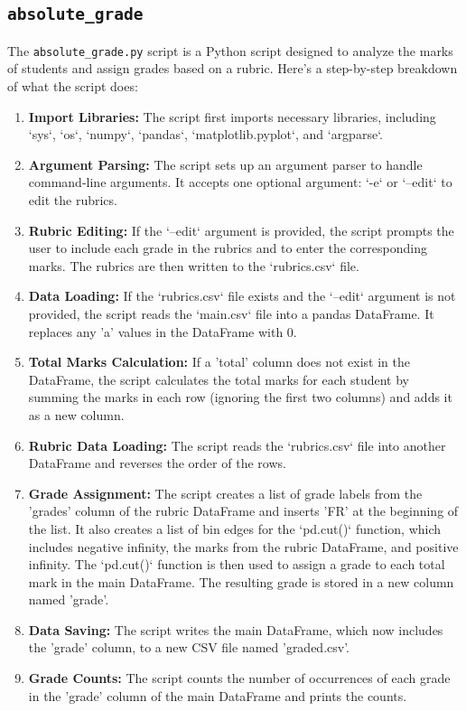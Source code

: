\documentclass{article}
\begin{document}
\subsection{\texttt{absolute\_grade}}
The \texttt{absolute\_grade.py} script is a Python script designed to analyze the marks of students and assign grades based on a rubric. Here's a step-by-step breakdown of what the script does:

\begin{enumerate}
    \item \textbf{Import Libraries:} The script first imports necessary libraries, including `sys`, `os`, `numpy`, `pandas`, `matplotlib.pyplot`, and `argparse`.

    \item \textbf{Argument Parsing:} The script sets up an argument parser to handle command-line arguments. It accepts one optional argument: `-e` or `--edit` to edit the rubrics.

    \item \textbf{Rubric Editing:} If the `--edit` argument is provided, the script prompts the user to include each grade in the rubrics and to enter the corresponding marks. The rubrics are then written to the `rubrics.csv` file.

    \item \textbf{Data Loading:} If the `rubrics.csv` file exists and the `--edit` argument is not provided, the script reads the `main.csv` file into a pandas DataFrame. It replaces any 'a' values in the DataFrame with 0.

    \item \textbf{Total Marks Calculation:} If a 'total' column does not exist in the DataFrame, the script calculates the total marks for each student by summing the marks in each row (ignoring the first two columns) and adds it as a new column.

    \item \textbf{Rubric Data Loading:} The script reads the `rubrics.csv` file into another DataFrame and reverses the order of the rows.

    \item \textbf{Grade Assignment:} The script creates a list of grade labels from the 'grades' column of the rubric DataFrame and inserts 'FR' at the beginning of the list. It also creates a list of bin edges for the `pd.cut()` function, which includes negative infinity, the marks from the rubric DataFrame, and positive infinity. The `pd.cut()` function is then used to assign a grade to each total mark in the main DataFrame. The resulting grade is stored in a new column named 'grade'.

    \item \textbf{Data Saving:} The script writes the main DataFrame, which now includes the 'grade' column, to a new CSV file named 'graded.csv'.

    \item \textbf{Grade Counts:} The script counts the number of occurrences of each grade in the 'grade' column of the main DataFrame and prints the counts.
\end{enumerate}
\end{document}
